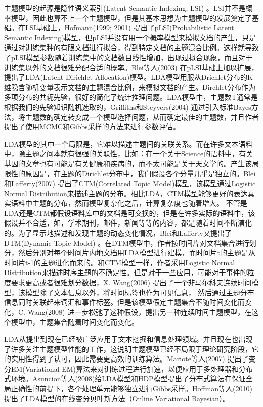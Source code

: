 主题模型的起源是隐性语义索引(Latent Semantic Indexing, LSI) \cite{deerwester1990indexing}。LSI并不是概率模型，因此也算不上一个主题模型，但是其基本思想为主题模型的发展奠定了基础。在LSI基础上，Hofmann(1999; 2001) \cite{hofmann1999probabilistic, hofmann2001unsupervised} 提出了pLSI(Probabilistic Latent Semantic Indexing)模型，但pLSI并没有用一个概率模型来模拟文档的产生，只是通过对训练集种的有限文档进行拟合，得到特定文档的主题混合比例。这样就导致了pLSI模型参数随着训练集中的文档数目线性增加，出现过拟合现象，而且对于训练集以外的文档很难分配合适的概率。Blei等人(2003) \cite{Blei:2003} 在pLSI基础上加以扩展，提出了LDA(Latent Dirichlet Allocation)模型。LDA模型用服从Drichlet分布的K维隐含随机变量表示文档的主题混合比例，来模拟文档的产生。Dirchlet分布作为多项分布的共轭先验，很好的简化了统计推理问题。LDA模型中，主题数T通常是根据我们的先验知识随机选取的，Griffiths和Steyvers(2004) \cite{griffiths2004finding} 通过引入标准Bayes方法，将主题数的确定转变成一个模型选择问题，从而确定最佳的主题数，并且作者提出了使用MCMC和Gibbs采样的方法来进行参数评估。

LDA模型的其中一个局限是，它难以描述主题间的关联关系。而在许多文本语料中，隐主题之间本就有很强的关联性，比如：在一个关于Science的语料中，有关基因的文章也有可能是有关健康和疾病的，而不太可能是关于天文学的。产生该局限性的原因是，在主题的Dirichlet分布中，我们假设各个分量几乎是独立的。Blei和Lafferty(2007) \cite{lafferty2005correlated} 提出了CTM(Correlated Topic Model)模型，该模型通过Logistic Normal Distribution来描述主题的分布。相比LDA，CTM模型能够更好的表达真实语料中主题的分布，然而模型复杂化之后，计算复杂度也随着增大。
不管是LDA还是CTM都假设语料库中的文档是可交换的，但是在许多实际的语料中，该假设并不合适，如，学术期刊，邮件，新闻等等的内容，都是随着时间不断演化的。为了显示地描述和发现主题的动态变化情况，Blei和Lafferty又提出了DTM(Dynamic Topic Model) \cite{Blei:2006} 。在DTM模型中，作者按时间片对文档集合进行划分，然后分别对每个时间片内地文档用LDA模型进行建模，而时间片t的主题是从时间片t-1的主题进化而来的。和CTM模型一样，作者采用Logistic Normal Distribution来描述时序主题的不确定性。但是对于一些应用，可能对于事件的粒度要求更高或者很难划分数据，X. Wang(2006) \cite{wang2006topics} 提出了一个非马尔科夫连续时间模型，该模型除了文本信息以外，将时间标签也作为可见信息，
然后通过主题分布信息同时关联起来词汇和事件标签。但是该模型假定主题集合不随时间变化而变化，C. Wang(2008) \cite{wang2008continuous} 进一步松弛了这种假设，提出另一种连续时间主题模型，在这个模型中，主题集合随着时间变化而变化。

LDA从提出到现在已经被广泛应用于文本挖掘和信息处理领域。并且现在也出现了许多关注主题模型性能的工作，这说明主题模型已经不局限于理论研究阶段，它的实用性得到了认可，因此需要更高效的训练算法。Mariote等人(2007)\cite{mariote2007parallelized} 提出了变分EM(Variational EM)算法来对训练过程进行加速，以便应用于多处理器和分布式环境。Asuncion等人(2008)给LDA模型和HDP模型提出了分布式算法在保证全局正确性的前提下，各个处理单元能够独立进行Gibbs采样。Hoffman等人(2010) \cite{hoffman2010online} 提出了LDA模型的在线变分贝叶斯方法（Online Variational Bayesian）。

